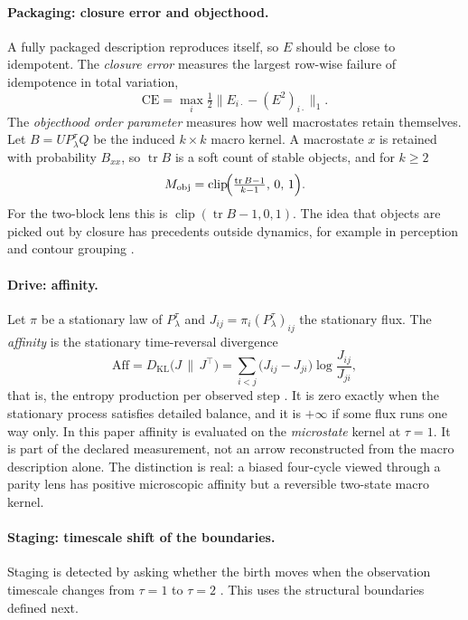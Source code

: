 \paragraph{Packaging: closure error and objecthood.} A fully packaged description reproduces itself, so $E$ should be close to idempotent. The \emph{closure error} measures the largest row-wise failure of idempotence in total variation,
\[
\mathrm{CE}=\max_i \tfrac12\bigl\|E_{i\cdot}-(E^2)_{i\cdot}\bigr\|_1 .
\]
The \emph{objecthood order parameter} measures how well macrostates retain themselves. Let $B=U P_\lambda^{\tau} Q$ be the induced $k\times k$ macro kernel. A macrostate $x$ is retained with probability $B_{xx}$, so $\operatorname{tr}B$ is a soft count of stable objects, and for $k\ge2$
\[
M_{\mathrm{obj}}=\operatorname{clip}\!\Bigl(\tfrac{\operatorname{tr}B-1}{k-1},\,0,\,1\Bigr).
\]
For the two-block lens this is $\operatorname{clip}(\operatorname{tr}B-1,0,1)$. The idea that objects are picked out by closure has precedents outside dynamics, for example in perception and contour grouping \cite{marino_scholl_2005,wang_wang_kubota_2004}.

\paragraph{Drive: affinity.} Let $\pi$ be a stationary law of $P_\lambda^{\tau}$ and $J_{ij}=\pi_i(P_\lambda^{\tau})_{ij}$ the stationary flux. The \emph{affinity} is the stationary time-reversal divergence
\[
\mathrm{Aff}=D_{\mathrm{KL}}\bigl(J\,\|\,J^{\top}\bigr)=\sum_{i<j}\bigl(J_{ij}-J_{ji}\bigr)\log\frac{J_{ij}}{J_{ji}},
\]
that is, the entropy production per observed step \cite{seifert_2012,liang_pigolotti_2023}. It is zero exactly when the stationary process satisfies detailed balance, and it is $+\infty$ if some flux runs one way only. In this paper affinity is evaluated on the \emph{microstate} kernel at $\tau=1$. It is part of the declared measurement, not an arrow reconstructed from the macro description alone. The distinction is real: a biased four-cycle viewed through a parity lens has positive microscopic affinity but a reversible two-state macro kernel.

\paragraph{Staging: timescale shift of the boundaries.} Staging is detected by asking whether the birth moves when the observation timescale changes from $\tau=1$ to $\tau=2$ \cite{landim_2019,defenu_2021}. This uses the structural boundaries defined next.

